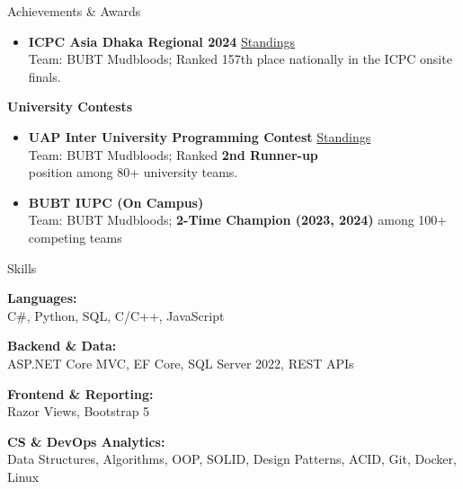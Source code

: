 \documentclass{resume}
\begin{document}
\begin{minipage}[t]{0.46\textwidth}
\begin{rSection}{Achievements \& Awards}
{\begin{itemize}[leftmargin=1.5em, itemsep=2pt, parsep=0pt, topsep=2pt]
    \item \textbf{ICPC Asia Dhaka Regional 2024} \hfill \href{https://bapsoj.org/contests/icpc-asia-dhaka-regional-contest-2024-onsite-round/standings}{Standings} \\
   Team: BUBT Mudbloods; Ranked 157th place nationally in the ICPC onsite finals.
\end{itemize}

\vspace{6pt}
{\bf University Contests}
\begin{itemize}[leftmargin=1.5em, itemsep=2pt, parsep=0pt, topsep=2pt]
    \item \textbf{UAP Inter University Programming Contest} \hfill \href{https://toph.co/c/uap-inter-university-collaborative-1-0-junior/standings}{Standings} \\
    Team: BUBT Mudbloods; Ranked \textbf{2nd Runner-up} \\ 
    position among 80+ university teams.

    \item \textbf{BUBT IUPC (On Campus)} \\
    Team: BUBT Mudbloods; \textbf{2-Time Champion (2023, 2024)} among 100+ competing teams
\end{itemize}
}
\end{rSection}


\begin{rSection}{Skills}

\textbf{Languages:}\\
C\#, Python, SQL, C/C++, JavaScript

\vspace{4pt}
\textbf{Backend \& Data:}\\
ASP.NET Core MVC, EF Core, SQL Server 2022, REST APIs

\vspace{4pt}
\textbf{Frontend \& Reporting:}\\
Razor Views, Bootstrap 5

\vspace{4pt}
\textbf{CS \& DevOps \textbar{} Analytics:}\\
Data Structures, Algorithms, OOP, SOLID, Design Patterns, ACID, Git, Docker, Linux 

\end{rSection}



\end{minipage}%
\end{document}
